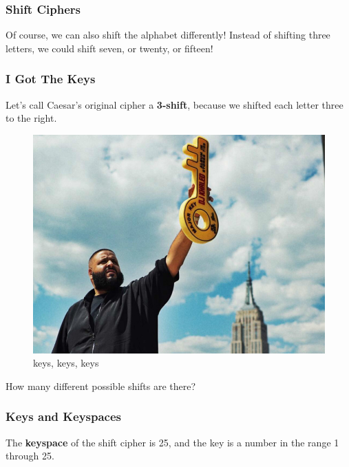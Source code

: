 \documentclass{beamer}
\newcommand{\<}{\langle}
\renewcommand{\>}{\rangle}
\begin{document}
\begin{frame}
\frametitle{Shift Ciphers}

Of course, we can also shift the alphabet differently! Instead of shifting three letters, we could shift seven, or twenty, or fifteen!
\end{frame}


\begin{frame}
\frametitle{I Got The Keys}

Let's call Caesar's original cipher a \textbf{3-shift}, because we shifted each letter three to the right. 

\begin{figure}
\includegraphics[scale=.18]{IMG/keys.jpg}
\caption{\tiny keys, keys, keys}
\end{figure}
How many different possible shifts are there?
\end{frame}

\begin{frame}
\frametitle{Keys and Keyspaces}

The \textbf{keyspace} of the shift cipher is 25, and the key is a number in the range 1 through 25. 
\end{frame}
\end{document}
